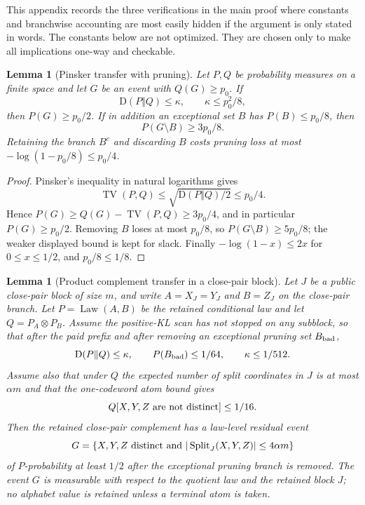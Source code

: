 \documentclass[11pt]{article}
\newtheorem{lemma}[theorem]{Lemma}
\theoremstyle{remark}
\newcommand{\KL}{\mathrm D}
\newcommand{\Split}{\operatorname{Split}}
\newcommand{\Law}{\operatorname{Law}}
\newcommand{\TV}{\operatorname{TV}}
\begin{document}
This appendix records the three verifications in the main proof where constants and branchwise accounting are most easily hidden if the argument is only stated in words.  The constants below are not optimized.  They are chosen only to make all implications one-way and checkable.

\begin{lemma}[Pinsker transfer with pruning]\label{lem:appendix-pinsker-transfer}
Let $P,Q$ be probability measures on a finite space and let $G$ be an event with $Q(G)\ge p_0$.  If
\[
        \KL(P\Vert Q)\le \kappa,
        \qquad \kappa\le p_0^2/8,
\]
then $P(G)\ge p_0/2$.  If in addition an exceptional set $B$ has $P(B)\le p_0/8$, then
\[
        P(G\setminus B)\ge 3p_0/8.
\]
Retaining the branch $B^c$ and discarding $B$ costs pruning loss at most $-\log(1-p_0/8)\le p_0/4$.
\end{lemma}

\begin{proof}
Pinsker's inequality in natural logarithms gives
\[
        \TV(P,Q)\le \sqrt{\KL(P\Vert Q)/2}\le p_0/4.
\]
Hence $P(G)\ge Q(G)-\TV(P,Q)\ge 3p_0/4$, and in particular $P(G)\ge p_0/2$.  Removing $B$ loses at most $p_0/8$, so $P(G\setminus B)\ge 5p_0/8$; the weaker displayed bound is kept for slack.  Finally $-\log(1-x)\le 2x$ for $0\le x\le 1/2$, and $p_0/8\le 1/8$.
\end{proof}

\begin{lemma}[Product complement transfer in a close-pair block]\label{lem:appendix-complement-transfer}
Let $J$ be a public close-pair block of size $m$, and write $A=X_J=Y_J$ and $B=Z_J$ on the close-pair branch.  Let $P=\Law(A,B)$ be the retained conditional law and let $Q=P_A\otimes P_B$.  Assume the positive-KL scan has not stopped on any subblock, so that after the paid prefix and after removing an exceptional pruning set $B_{\rm bad}$,
\[
        \KL(P\Vert Q)\le \kappa,
        \qquad P(B_{\rm bad})\le 1/64,
        \qquad \kappa\le 1/512.
\]
Assume also that under $Q$ the expected number of split coordinates in $J$ is at most $\alpha m$ and that the one-codeword atom bound gives
\[
        Q[X,Y,Z\hbox{ are not distinct}]\le 1/16.
\]
Then the retained close-pair complement has a law-level residual event
\[
        G=\{X,Y,Z\hbox{ distinct and } |\Split_J(X,Y,Z)|\le 4\alpha m\}
\]
of $P$-probability at least $1/2$ after the exceptional pruning branch is removed.  The event $G$ is measurable with respect to the quotient law and the retained block $J$; no alphabet value is retained unless a terminal atom is taken.
\end{lemma}
\end{document}
